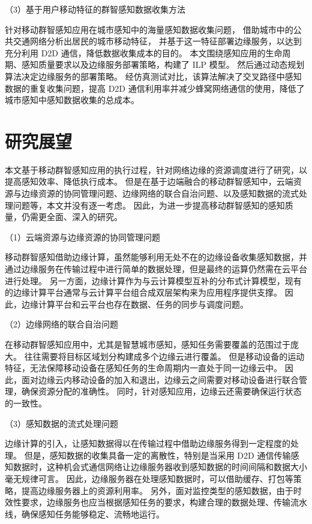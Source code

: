 （3）基于用户移动特征的群智感知数据收集方法

针对移动群智感知应用在城市感知中的海量感知数据收集问题，
借助城市中的公共交通网络分析出居民的城市移动特征，
并基于这一特征部署边缘服务，以达到充分利用 D2D 通信，降低数据收集成本的目的。
本文围绕感知应用的生命周期、感知质量要求以及边缘服务部署策略，构建了 ILP 模型。
然后通过动态规划算法决定边缘服务的部署策略。
经仿真测试对比，该算法解决了交叉路径中感知数据的重复收集问题，提高 D2D 通信利用率并减少蜂窝网络通信的使用，降低了城市感知中感知数据收集的总成本。

\section{研究展望}

本文基于移动群智感知应用的执行过程，针对网络边缘的资源调度进行了研究，以提高感知效率、降低执行成本。
但是在基于边端融合的移动群智感知中，云端资源与边缘资源的协同管理问题、边缘网络的联合自治问题、以及感知数据的流式处理问题等，本文并没有逐一考虑。
因此，为进一步提高移动群智感知的感知质量，仍需更全面、深入的研究。

（1）云端资源与边缘资源的协同管理问题

移动群智感知借助边缘计算，虽然能够利用无处不在的边缘设备收集感知数据，并通过边缘服务在传输过程中进行简单的数据处理，但是最终的运算仍然需在云平台进行处理。
另一方面，边缘计算作为与云计算模型互补的分布式计算模型，现有的边缘计算平台通常与云计算平台组合成双层架构来为应用程序提供支撑。
因此，边缘计算平台和云平台也存在数据、任务的同步与调度问题。

（2）边缘网络的联合自治问题

在移动群智感知应用中，尤其是智慧城市感知，感知任务需要覆盖的范围过于庞大。
往往需要将目标区域划分构建成多个边缘云进行覆盖。
但是移动设备的运动特征，无法保障移动设备在感知任务的生命周期内一直处于同一边缘云中。
因此，面对边缘云内移动设备的加入和退出，边缘云之间需要对移动设备进行联合管理，确保资源分配的准确性。
同时，针对感知应用，边缘云还需要确保运行状态的一致性。

（3）感知数据的流式处理问题

边缘计算的引入，让感知数据得以在传输过程中借助边缘服务得到一定程度的处理。
但是，感知数据的收集具备一定的离散性，特别是当采用 D2D 通信传输感知数据时，这种机会式通信网络让边缘服务器收到感知数据的时间间隔和数据大小毫无规律可言。
因此，边缘服务器在处理感知数据时，可以借助缓存、打包等策略，提高边缘服务器上的资源利用率。
另外，面对监控类型的感知数据，由于时效性要求，边缘服务也应当根据感知任务的要求，构建合理的数据处理、传输流水线，确保感知任务能够稳定、流畅地运行。
